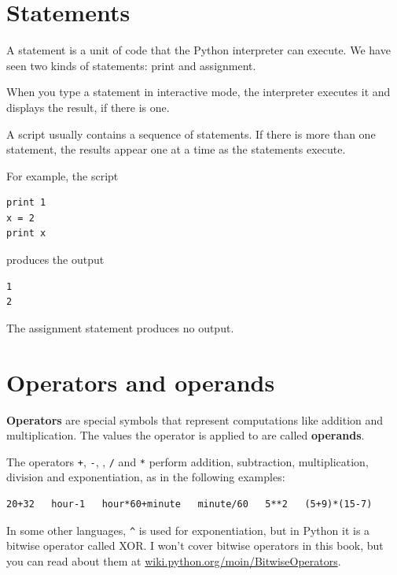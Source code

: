 \documentclass[10pt]{book}
\begin{document}
\section{Statements}

A statement is a unit of code that the Python interpreter can
execute.  We have seen two kinds of statements: print
and assignment.


When you type a statement in interactive mode, the interpreter
executes it and displays the result, if there is one.

A script usually contains a sequence of statements.  If there
is more than one statement, the results appear one at a time
as the statements execute.

For example, the script

\beforeverb
\begin{verbatim}
print 1
x = 2
print x
\end{verbatim}
\afterverb
%
produces the output

\beforeverb
\begin{verbatim}
1
2
\end{verbatim}
\afterverb
%
The assignment statement produces no output.


\section{Operators and operands}

{\bf Operators} are special symbols that represent computations like
addition and multiplication.  The values the operator is applied to
are called {\bf operands}.

The operators {\tt +}, {\tt -}, {\tt *}, {\tt /} and {\tt **}
perform addition, subtraction, multiplication, division and
exponentiation, as in the following examples:

\beforeverb
\begin{verbatim}
20+32   hour-1   hour*60+minute   minute/60   5**2   (5+9)*(15-7)
\end{verbatim}
\afterverb
%
In some other languages, \verb"^" is used for exponentiation, but
in Python it is a bitwise operator called XOR.  I won't cover
bitwise operators in this book, but you can read about
them at \url{wiki.python.org/moin/BitwiseOperators}.

\end{document}
